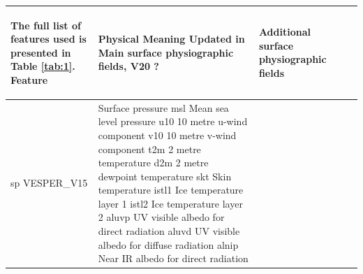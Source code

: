 \documentclass[hess, twostagejnl]{copernicus}
\providecommand{\DIFadd}[1]{{\protect\color{blue} \sf #1}} %
\providecommand{\DIFdel}[1]{{\protect\color{red} \scriptsize #1}} %
\providecommand{\DIFaddFL}[1]{\DIFadd{#1}} %
\providecommand{\DIFdelFL}[1]{\DIFdel{#1}} %
\providecommand{\DIFaddbeginFL}{} %
\providecommand{\DIFaddendFL}{} %
\providecommand{\DIFdelbeginFL}{} %
\providecommand{\DIFdelendFL}{} %
\begin{document}
\begin{table}
\begin{tabularx}{\textwidth}{lXXXX}
\begin{enumerate}
{}
\end{enumerate}%
\DIFdelFL{The full list of features used is presented in Table \ref{tab:1}. 
}%
\DIFdelFL{Feature              }\DIFdelendFL & \DIFdelbeginFL \DIFdelFL{Physical Meaning }%
\DIFdelFL{Updated in }\DIFdelendFL \DIFaddbeginFL \DIFaddFL{Main surface physiographic fields, }\DIFaddendFL V20 \DIFdelbeginFL \DIFdelFL{?  }\DIFdelendFL \DIFaddbeginFL & \DIFaddFL{Additional surface physiographic fields }\DIFaddendFL \\
 		\hline
 		\DIFdelbeginFL \DIFdelFL{sp }\DIFdelendFL \DIFaddbeginFL \DIFaddFL{VESPER\_V15 }\DIFaddendFL & \DIFdelbeginFL \DIFdelFL{Surface pressure }%
\DIFdelFL{msl }%
\DIFdelFL{Mean sea level pressure }%
\DIFdelFL{u10 }%
\DIFdelFL{10 metre u-wind component }%
\DIFdelFL{v10 }%
\DIFdelFL{10 metre v-wind component }%
\DIFdelFL{t2m }%
\DIFdelFL{2 metre temperature }%
\DIFdelFL{d2m }%
\DIFdelFL{2 metre dewpoint temperature  }%
\DIFdelFL{skt }%
\DIFdelFL{Skin temperature }%
\DIFdelFL{istl1 }%
\DIFdelFL{Ice temperature layer 1 }%
\DIFdelFL{istl2 }%
\DIFdelFL{Ice temperature layer 2 }%
\DIFdelFL{aluvp }%
\DIFdelFL{UV visible albedo for direct radiation }%
\DIFdelFL{aluvd }%
\DIFdelFL{UV visible albedo for diffuse radiation }%
\DIFdelFL{alnip }%
\DIFdelFL{Near IR albedo for direct radiation }%

\end{tabularx}
\end{table}
\end{document}

